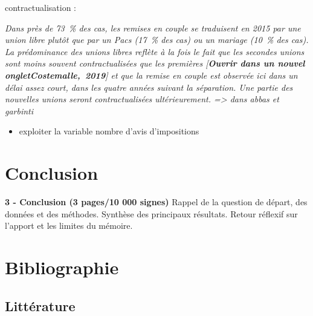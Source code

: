 \documentclass[
  12pt,
]{book}
\providecommand{\tightlist}{%
  \setlength{\itemsep}{0pt}\setlength{\parskip}{0pt}}
\begin{document}
contractualisation :

\emph{Dans près de 73~\% des cas, les remises en couple se traduisent en
2015 par une union libre plutôt que par un Pacs (17~\% des cas) ou un
mariage (10~\% des cas). La prédominance des unions libres reflète à la
fois le fait que les secondes unions sont moins souvent contractualisées
que les premières {[}\textbf{Ouvrir dans un nouvel
ongletCostemalle,~2019}{]} et que la remise en couple est observée ici
dans un délai assez court, dans les quatre années suivant la séparation.
Une partie des nouvelles unions seront contractualisées ultérieurement.
=\textgreater{} dans abbas et garbinti}

\begin{itemize}
\tightlist
\item
  exploiter la variable nombre d'avis d'impositions
\end{itemize}

\listoftables

\listoffigures

\newpage

\chapter{Conclusion}\label{conclusion}

\textbf{3 - Conclusion (3 pages/10 000 signes)} Rappel de la question de
départ, des données et des méthodes. Synthèse des principaux résultats.
Retour réflexif sur l'apport et les limites du mémoire.

\chapter{Bibliographie}\label{bibliographie}

\section{Littérature}\label{littuxe9rature}

\setlength{\itemindent}{-.5in}
\end{document}
